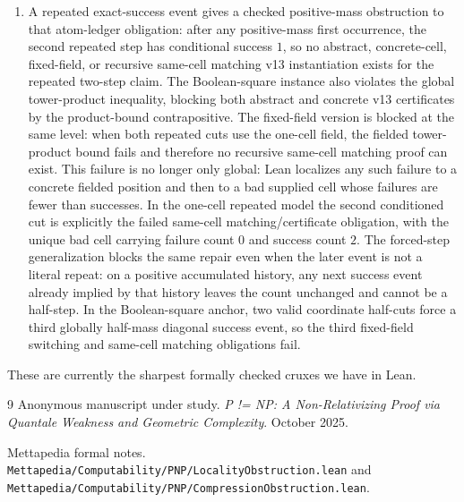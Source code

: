 \documentclass[11pt]{article}
\theoremstyle{remark}
\begin{document}
\begin{enumerate}[leftmargin=1.5em]
  prefix point must have a same-cell failed prefix point; a single successful point whose supplied
  field cell contains only successes is already enough to rule out the matching and certificate.
  \item A repeated exact-success event gives a checked positive-mass obstruction to that atom-ledger
  obligation: after any positive-mass first occurrence, the second repeated step has conditional
  success \(1\), so no abstract, concrete-cell, fixed-field, or recursive same-cell matching v13
  instantiation exists for the repeated two-step claim.  The Boolean-square instance also violates
  the global tower-product inequality, blocking both abstract and concrete v13 certificates by the
  product-bound contrapositive.  The fixed-field version is blocked at the same level: when
  both repeated cuts use the one-cell field, the fielded tower-product bound fails and therefore no
  recursive same-cell matching proof can exist.  This failure is no longer only global: Lean
  localizes any such failure to a concrete fielded position and then to a bad supplied cell whose
  failures are fewer than successes.  In the one-cell repeated model the second conditioned cut is
  explicitly the failed same-cell matching/certificate obligation, with the unique bad cell
  carrying failure count \(0\) and success count \(2\).
  The forced-step generalization blocks the same repair even when the later event is not a literal
  repeat: on a positive accumulated history, any next success event already implied by that history
  leaves the count unchanged and cannot be a half-step.  In the Boolean-square anchor, two valid
  coordinate half-cuts force a third globally half-mass diagonal success event, so the third
  fixed-field switching and same-cell matching obligations fail.
\end{enumerate}

These are currently the sharpest formally checked cruxes we have in Lean.

\begin{thebibliography}{9}
Anonymous manuscript under study.
\newblock \emph{P != NP: A Non-Relativizing Proof via Quantale Weakness and Geometric Complexity}.
\newblock October 2025.

Mettapedia formal notes.
\newblock \texttt{Mettapedia/Computability/PNP/LocalityObstruction.lean} and
\texttt{Mettapedia/Computability/PNP/CompressionObstruction.lean}.
\end{thebibliography}
\end{document}
